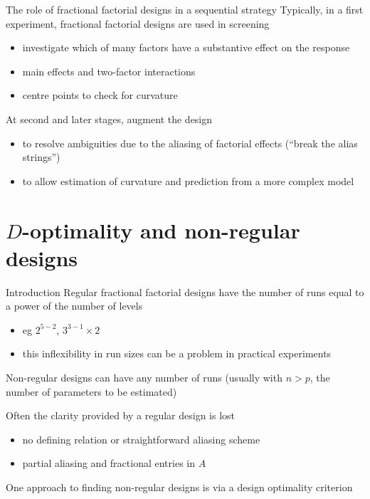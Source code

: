 \documentclass[
  ignorenonframetext,
]{beamer}
\providecommand{\tightlist}{%
  \setlength{\itemsep}{0pt}\setlength{\parskip}{0pt}}
\begin{document}
\begin{frame}{The role of fractional factorial designs in a sequential
strategy}
\protect\hypertarget{the-role-of-fractional-factorial-designs-in-a-sequential-strategy}{}
Typically, in a first experiment, fractional factorial designs are used
in screening

\begin{itemize}
\tightlist
\item
  investigate which of many factors have a substantive effect on the
  response
\item
  main effects and two-factor interactions
\item
  centre points to check for curvature
\end{itemize}

At second and later stages, augment the design

\begin{itemize}
\tightlist
\item
  to resolve ambiguities due to the aliasing of factorial effects
  (``break the alias strings'')
\item
  to allow estimation of curvature and prediction from a more complex
  model
\end{itemize}
\end{frame}

\hypertarget{d-optimality-and-non-regular-designs}{%
\section{\texorpdfstring{\(D\)-optimality and non-regular
designs}{D-optimality and non-regular designs}}\label{d-optimality-and-non-regular-designs}}

\begin{frame}{Introduction}
\protect\hypertarget{introduction}{}
Regular fractional factorial designs have the number of runs equal to a
power of the number of levels

\begin{itemize}
\tightlist
\item
  eg \(2^{5-2}\), \(3^{3-1}\times 2\)
\item
  this inflexibility in run sizes can be a problem in practical
  experiments
\end{itemize}

Non-regular designs can have any number of runs (usually with \(n>p\),
the number of parameters to be estimated)

Often the clarity provided by a regular design is lost

\begin{itemize}
\tightlist
\item
  no defining relation or straightforward aliasing scheme
\item
  partial aliasing and fractional entries in \(A\)
\end{itemize}

One approach to finding non-regular designs is via a design optimality
criterion
\end{frame}
\end{document}
